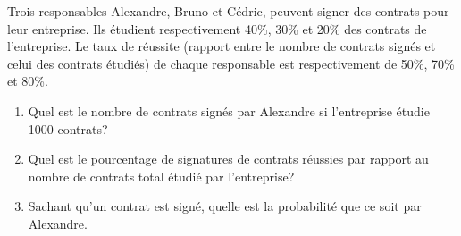 \documentclass[a4paper]{article}
\newif\ifcorrection
\begin{document}
\exost Trois responsables Alexandre, Bruno et C\'edric, peuvent signer des contrats pour leur entreprise.
Ils \'etudient respectivement 40\%, 30\% et 20\% des contrats de l'entreprise.
Le taux de r\'eussite (rapport entre le nombre de contrats sign\'es et celui des contrats \'etudi\'es)
de chaque responsable est respectivement de 50\%, 70\% et 80\%.
\begin{enumerate}
 \item Quel est le nombre de contrats sign\'es par Alexandre si l'entreprise \'etudie 1000 contrats?
 \ifcorrection
 \textcolor{red}{
 Alexandre signe 50\% des 40\% \'etudi\'es soit $0.5 \times 0.4 \times 1000 = 200$ contrats.
 }
\fi
 \item Quel est le pourcentage de signatures de contrats r\'eussies par rapport au nombre de contrats total \'etudi\'e par l'entreprise?
 \ifcorrection
 \textcolor{red}{
 L'entreprise a sign\'e $1000 \times (0.5\times 0.4 + 0.7\times 0.3 + 0.8\times 0.2 ) = 1000 \times (0.20 + 0.21 + 0.16) = 570 $ contrat.
 L'entreprise signe $57\%$ de ses contrats.
 }
\fi
 \item Sachant qu'un contrat est sign\'e, quelle est la probabilit\'e que ce soit par Alexandre.
 \ifcorrection
 \textcolor{red}{
 On note $A$ l'\'ev\'enement $\{ \text{Alexandre \'etudie un contrat} \}$, et $S$ l'\'ev\'enement un contrat est sign\'e.
 Nous avons $P(A) = 0.4$, $P(S) = 0.57$ et $P(S|A) = 0.5$
 Donc $P(A|S) = \frac{P(A \cap S)}{P(S)} = \frac{P(A) P(S|A)}{P(S)} = \frac{0.4 \times 0.5}{0.57} \approx 0.35$
 }
\fi
\end{enumerate}
\end{document}
